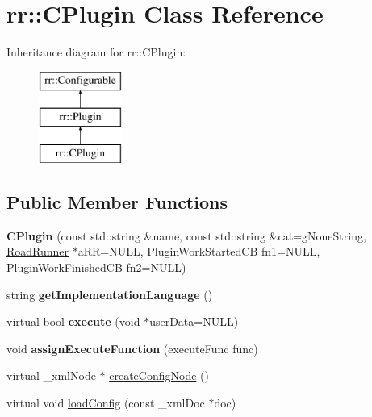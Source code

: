 \hypertarget{classrr_1_1_c_plugin}{\section{rr\-:\-:C\-Plugin Class Reference}
\label{classrr_1_1_c_plugin}
}
Inheritance diagram for rr\-:\-:C\-Plugin\-:\begin{figure}[H]
\begin{center}
\leavevmode
\includegraphics[height=3.000000cm]{classrr_1_1_c_plugin}
\end{center}
\end{figure}
\subsection*{Public Member Functions}
\begin{DoxyCompactItemize}
\item 
\hypertarget{classrr_1_1_c_plugin_a855d84b68fb289fbeb7f36b2a7f63e43}{{\bfseries C\-Plugin} (const std\-::string \&name, const std\-::string \&cat=g\-None\-String, \hyperlink{classrr_1_1_road_runner}{Road\-Runner} $\ast$a\-R\-R=N\-U\-L\-L, Plugin\-Work\-Started\-C\-B fn1=N\-U\-L\-L, Plugin\-Work\-Finished\-C\-B fn2=N\-U\-L\-L)}\label{classrr_1_1_c_plugin_a855d84b68fb289fbeb7f36b2a7f63e43}

\item 
\hypertarget{classrr_1_1_c_plugin_aaa85de48934f386d863d18e341cc644a}{string {\bfseries get\-Implementation\-Language} ()}\label{classrr_1_1_c_plugin_aaa85de48934f386d863d18e341cc644a}

\item 
\hypertarget{classrr_1_1_c_plugin_a31b1de3e652801defabf50d005a0fb3b}{virtual bool {\bfseries execute} (void $\ast$user\-Data=N\-U\-L\-L)}\label{classrr_1_1_c_plugin_a31b1de3e652801defabf50d005a0fb3b}

\item 
\hypertarget{classrr_1_1_c_plugin_a70b1dcc1fbee17c5bb04995fa4923f6a}{void {\bfseries assign\-Execute\-Function} (execute\-Func func)}\label{classrr_1_1_c_plugin_a70b1dcc1fbee17c5bb04995fa4923f6a}

\item 
virtual \-\_\-xml\-Node $\ast$ \hyperlink{classrr_1_1_c_plugin_a23101a2d428be01237034d4a8c309278}{create\-Config\-Node} ()
\item 
virtual void \hyperlink{classrr_1_1_c_plugin_ad8f3f7ffa4260709d11bf759cb495bb7}{load\-Config} (const \-\_\-xml\-Doc $\ast$doc)
\end{DoxyCompactItemize}
